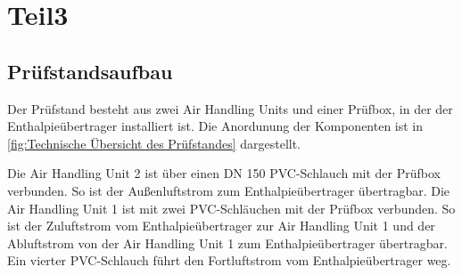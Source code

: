 \chapter{Teil3}
\label{cha:Pruefstandsaufbau}


\section{Prüfstandsaufbau}
\label{sec:Pruefstandsaufbau}

Der Prüfstand besteht aus zwei Air Handling Units und einer Prüfbox, in der der Enthalpieübertrager installiert ist. Die Anordunung der Komponenten ist in \ref{fig:Technische Übersicht des Prüfstandes} dargestellt. 

Die Air Handling Unit 2 ist über einen DN 150 PVC-Schlauch mit der Prüfbox verbunden. So ist der Außenluftstrom zum Enthalpieübertrager übertragbar. Die Air Handling Unit 1 ist mit zwei PVC-Schläuchen mit der Prüfbox verbunden. So ist der Zuluftstrom vom Enthalpieübertrager zur Air Handling Unit 1 und der Abluftstrom von der Air Handling Unit 1 zum Enthalpieübertrager übertragbar. Ein vierter PVC-Schlauch führt den Fortluftstrom vom Enthalpieübertrager weg.
 
